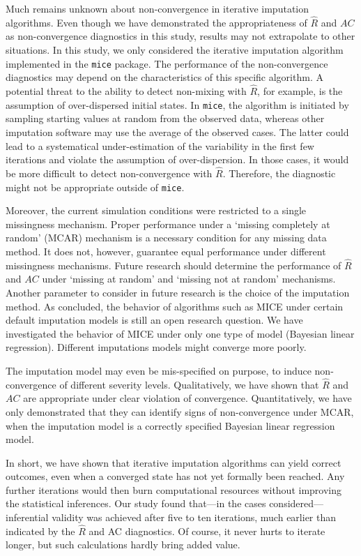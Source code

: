 \documentclass[Royal,times,sageh]{sagej}
\begin{document}
Much remains unknown about non-convergence in iterative imputation algorithms. Even though we have demonstrated the appropriateness of \(\widehat{R}\) and \(AC\) as non-convergence diagnostics in this study, results may not extrapolate to other situations. In this study, we only considered the iterative imputation algorithm implemented in the \texttt{mice} package. The performance of the non-convergence diagnostics may depend on the characteristics of this specific algorithm. A potential threat to the ability to detect non-mixing with \(\widehat{R}\), for example, is the assumption of over-dispersed initial states. In \texttt{mice}, the algorithm is initiated by sampling starting values at random from the observed data, whereas other imputation software may use the average of the observed cases. The latter could lead to a systematical under-estimation of the variability in the first few iterations and violate the assumption of over-dispersion. In those cases, it would be more difficult to detect non-convergence with \(\widehat{R}\). Therefore, the diagnostic might not be appropriate outside of \texttt{mice}.

Moreover, the current simulation conditions were restricted to a single missingness mechanism. Proper performance under a `missing completely at random' (MCAR) mechanism is a necessary condition for any missing data method. It does not, however, guarantee equal performance under different missingness mechanisms. Future research should determine the performance of \(\widehat{R}\) and \(AC\) under `missing at random' and `missing not at random' mechanisms. Another parameter to consider in future research is the choice of the imputation method. As \citet{murr18} concluded, the behavior of algorithms such as MICE under certain default imputation models is still an open research question. We have investigated the behavior of MICE under only one type of model (Bayesian linear regression). Different imputations models might converge more poorly.

The imputation model may even be mis-specified on purpose, to induce non-convergence of different severity levels. Qualitatively, we have shown that \(\widehat{R}\) and \(AC\) are appropriate under clear violation of convergence. Quantitatively, we have only demonstrated that they can identify signs of non-convergence under MCAR, when the imputation model is a correctly specified Bayesian linear regression model. \newline \newline

\noindent In short, we have shown that iterative imputation algorithms can yield correct outcomes, even when a converged state has not yet formally been reached. Any further iterations would then burn computational resources without improving the statistical inferences. Our study found that---in the cases considered---inferential validity was achieved after five to ten iterations, much earlier than indicated by the \(\widehat{R}\) and AC diagnostics. Of course, it never hurts to iterate longer, but such calculations hardly bring added value.



\end{document}
